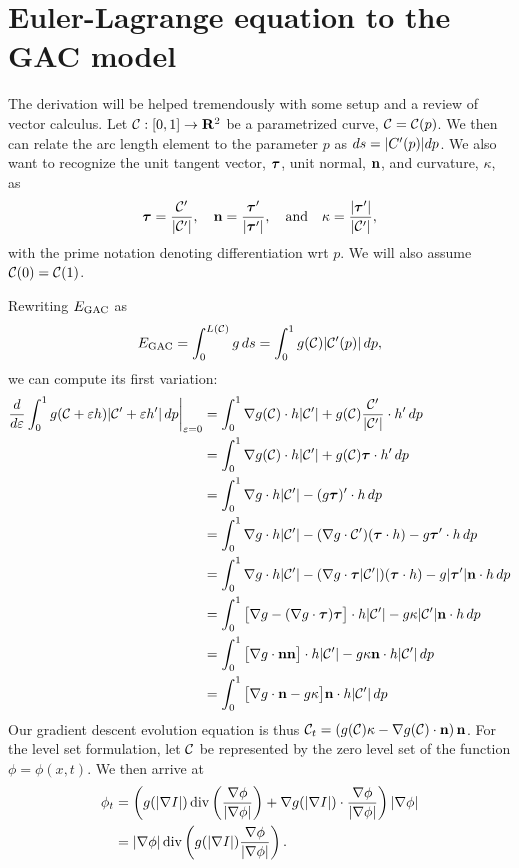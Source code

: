 \section{Euler-Lagrange equation to the GAC model}
The derivation will be helped tremendously with some setup and a review of vector calculus. Let $\mathcal{C}: [0,1]\rightarrow \mathbf{R}^2$ be a parametrized curve, $\mathcal{C} = \mathcal{C}(p)$. We then can relate the arc length element to the parameter $p$ as $ds = \lvert C'(p)\rvert dp$. We also want to recognize the unit tangent vector, $\boldsymbol{\tau}$, unit normal, $\mathbf{n}$, and curvature, $\kappa$, as 
\begin{align*}
\boldsymbol{\tau} 
= \frac{\mathcal{C}'}{\lvert\mathcal{C}'\rvert},\quad 
\mathbf{n} 
= \frac{ \boldsymbol{\tau} '}{\lvert\boldsymbol{\tau}'\rvert},
\quad\text{and}\quad 
\kappa = \frac{ \lvert\boldsymbol{\tau}'\rvert }{ \lvert \mathcal{C}' \rvert },
\end{align*}
with the prime notation denoting differentiation wrt $p$. We will also assume $\mathcal{C}(0) = \mathcal{C}(1)$. 

Rewriting $E_\textrm{GAC}$ as 
\begin{align*}
E_\textrm{GAC} = \int^{L(\mathcal{C})}_0 g \, ds 
= \int^1_0 g(\mathcal{C}) \lvert\mathcal{C}'(p)\rvert \, dp ,
\end{align*} 
we can compute its first variation: 
\begin{align*}
\frac{d}{d\varepsilon} \int^1_0 g(\mathcal{C} + \varepsilon h) \lvert\mathcal{C}' + \varepsilon h'\rvert \, dp \bigg\rvert_{\varepsilon = 0}
&=  \int^1_0 \nabla g(\mathcal{C}) \cdot h \lvert\mathcal{C}'\rvert + g(\mathcal{C}) \frac{\mathcal{C}'}{\lvert\mathcal{C}'\rvert} \cdot h' \,dp 
\\
&=\int^1_0 \nabla g(\mathcal{C}) \cdot h \lvert\mathcal{C}'\rvert + g(\mathcal{C}) \boldsymbol{\tau} \cdot h' \,dp 
\\
&=\int^1_0 \nabla g \cdot h \lvert\mathcal{C}'\rvert - ( g \boldsymbol{\tau})' \cdot h \, dp
\\
&=\int^1_0 \nabla g \cdot h \lvert\mathcal{C}'\rvert - (\nabla g \cdot \mathcal{C}')(\boldsymbol{\tau} \cdot h) - g\boldsymbol{\tau} ' \cdot h \, dp
\\
&=\int^1_0 \nabla g \cdot h \lvert\mathcal{C}'\rvert - (\nabla g \cdot \boldsymbol{\tau} \lvert\mathcal{C}'\rvert )(\boldsymbol{\tau} \cdot h) - g\lvert\boldsymbol{\tau}'\rvert \mathbf{n} \cdot h \, dp
\\
&=\int^1_0 \big[ \nabla g  - (\nabla g \cdot \boldsymbol{\tau} )\boldsymbol{\tau} \big] \cdot h \lvert\mathcal{C}'\rvert - g\kappa \lvert\mathcal{C}'\rvert \mathbf{n} \cdot h \, dp
\\
&=\int^1_0 \big[\nabla g \cdot \mathbf{n} \mathbf{n} \big] \cdot h \lvert\mathcal{C}'\rvert - g\kappa  \mathbf{n} \cdot h \lvert\mathcal{C}'\rvert \, dp
\\
&=\int^1_0 \big[ \nabla g \cdot \mathbf{n} - g\kappa \big] \mathbf{n}  \cdot h \lvert\mathcal{C}'\rvert \, dp
\\ 
\end{align*}
Our gradient descent evolution equation is thus $\mathcal{C}_t = \left( g(\mathcal{C}) \kappa - \nabla g(\mathcal{C}) \cdot \mathbf{n} \right) \mathbf{n} $.
For the level set formulation, let $\mathcal{C}$ be represented by the zero level set of the function $\phi = \phi(x, t)$. We then arrive at 
\begin{align*}
\phi_t 
&= \left(
g( \lvert\nabla I \rvert ) \operatorname{div}\left( \frac{\nabla \phi}{\lvert\nabla \phi\rvert} \right)
	+  \nabla g(  \lvert\nabla I \rvert )\cdot  \frac{\nabla \phi}{\lvert\nabla \phi\rvert}
\right) \lvert \nabla \phi \rvert
\\
&= \lvert\nabla \phi\rvert \operatorname{div}\left( 
g(  \lvert\nabla I \rvert ) \frac{\nabla \phi}{\lvert\nabla \phi\rvert}
\right) .
\end{align*}


